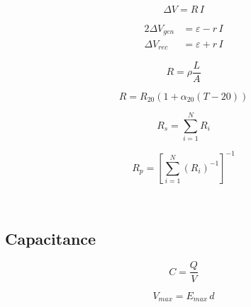 \documentclass{form}
\begin{document}
\begin{minipage}[c]{0.09\textwidth}
	\begin{equation*}
		\Delta V = R\,I
	\end{equation*}
\end{minipage}
\begin{minipage}[c]{0.14\textwidth}
	\begin{alignat*}{2}
		{\Delta V}_{gen} &= \varepsilon - r\,I \\
		{\Delta V}_{rec} &= \varepsilon + r\,I
	\end{alignat*}
\end{minipage}
\begin{minipage}[c]{0.09\textwidth}
	\begin{equation*}
		R = \rho \frac{L}{A}
	\end{equation*}
\end{minipage}
\begin{minipage}[c]{0.19\textwidth}
	\begin{equation*}
		R=R_{20}(1+\alpha_{20}(T-20))
	\end{equation*}
\end{minipage}
\begin{minipage}[c]{0.11\textwidth}
	\begin{equation*}
		R_s = \sum_{i=1}^{N}{R_i}
	\end{equation*}
\end{minipage}
\begin{minipage}[c]{0.18\textwidth}
	\begin{equation*}
		R_p = \left[\sum_{i=1}^{N}{(R_i)^{-1}}\right]^{-1}
	\end{equation*}
\end{minipage} \\
\begin{minipage}[c]{0.15\textwidth}
	\subsection*{Capacitance}
\end{minipage}
\begin{minipage}[c]{0.06\textwidth}
	\begin{equation*}
		C=\frac{Q}{V}
	\end{equation*}
\end{minipage}
\begin{minipage}[c]{0.15\textwidth}
	\begin{equation*}
		V_{max} = E_{max}\,d
	\end{equation*}
\end{minipage}
\end{document}
